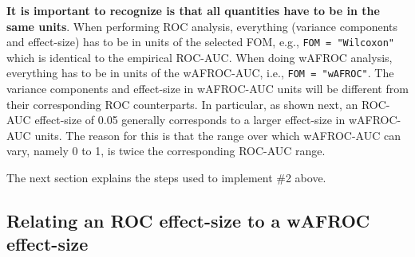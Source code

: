 \documentclass[
]{book}
\begin{document}
\textbf{It is important to recognize is that all quantities have to be in the same units}. When performing ROC analysis, everything (variance components and effect-size) has to be in units of the selected FOM, e.g., \texttt{FOM\ =\ "Wilcoxon"} which is identical to the empirical ROC-AUC. When doing wAFROC analysis, everything has to be in units of the wAFROC-AUC, i.e., \texttt{FOM\ =\ "wAFROC"}. The variance components and effect-size in wAFROC-AUC units will be different from their corresponding ROC counterparts. In particular, as shown next, an ROC-AUC effect-size of 0.05 generally corresponds to a larger effect-size in wAFROC-AUC units. The reason for this is that the range over which wAFROC-AUC can vary, namely 0 to 1, is twice the corresponding ROC-AUC range.

The next section explains the steps used to implement \#2 above.

\hypertarget{relating-an-roc-effect-size-to-a-wafroc-effect-size}{%
\subsection{Relating an ROC effect-size to a wAFROC effect-size}\label{relating-an-roc-effect-size-to-a-wafroc-effect-size}}
\end{document}
